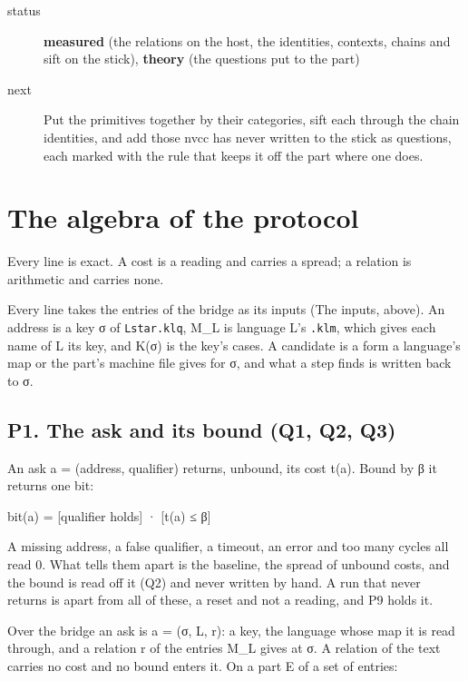 \begin{description}
\item[{status}] \textbf{measured} (the relations on the host, the identities, contexts, chains and sift on the stick), \textbf{theory} (the questions put to the part)
\item[{next}] Put the primitives together by their categories, sift each through the chain identities, and add those nvcc has never written to the stick as questions, each marked with the rule that keeps it off the part where one does.
\end{description}

\section{\texorpdfstring{The algebra of the protocol}{The algebra of the protocol}}

Every line is exact. A cost is a reading and carries a spread; a relation is arithmetic and carries none.

Every line takes the entries of the bridge as its inputs (The inputs, above). An address is a key σ of \texttt{Lstar.\allowbreak{}klq}, M\_\allowbreak{}L is language L's \texttt{.\allowbreak{}klm}, which gives each name of L its key, and K(σ) is the key's cases. A candidate is a form a language's map or the part's machine file gives for σ, and what a step finds is written back to σ.

\subsection{\texorpdfstring{P1. The ask and its bound (Q1, Q2, Q3)}{P1. The ask and its bound (Q1, Q2, Q3)}}

An ask a = (address, qualifier) returns, unbound, its cost t(a). Bound by β it returns one bit:

bit(a) = [qualifier holds] · [t(a) ≤ β]

A missing address, a false qualifier, a timeout, an error and too many cycles all read 0. What tells them apart is the baseline, the spread of unbound costs, and the bound is read off it (Q2) and never written by hand. A run that never returns is apart from all of these, a reset and not a reading, and P9 holds it.

Over the bridge an ask is a = (σ, L, r): a key, the language whose map it is read through, and a relation r of the entries M\_\allowbreak{}L gives at σ. A relation of the text carries no cost and no bound enters it. On a part E of a set of entries:

